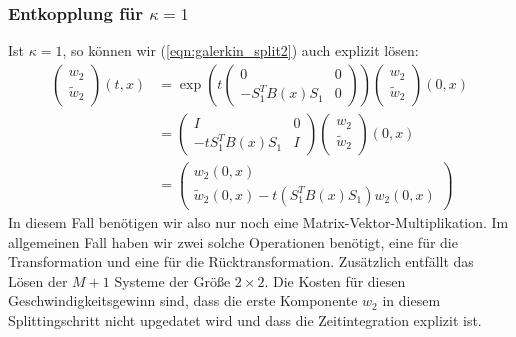 \subsubsection*{Entkopplung für $\kappa =1$}
Ist $\kappa=1$, so können wir (\ref{eqn:galerkin_split2}) auch explizit lösen:
\begin{align*}
\begin{pmatrix}w_2\\\tilde{w}_2\end{pmatrix}(t,x)&=\exp\left(t\begin{pmatrix}0 & 0\\ -S_1^TB(x)S_1 & 0\end{pmatrix}\right)\begin{pmatrix}w_2\\\tilde{w}_2\end{pmatrix}(0,x)\\
&=\begin{pmatrix}I & 0\\ -tS_1^TB(x)S_1 & I\end{pmatrix}\begin{pmatrix}w_2\\\tilde{w}_2\end{pmatrix}(0,x)\\
&=\begin{pmatrix}w_2(0,x)\\\tilde{w}_2(0,x)-t\left(S_1^TB(x)S_1\right)w_2(0,x)\end{pmatrix}
\end{align*}
In diesem Fall benötigen wir also nur noch eine Matrix-Vektor-Multiplikation. Im allgemeinen Fall haben wir zwei solche Operationen benötigt, eine für die Transformation und eine für die Rücktransformation. Zusätzlich entfällt das Lösen der $M+1$ Systeme der Größe $2\times 2$. Die Kosten für diesen Geschwindigkeitsgewinn sind, dass die erste Komponente $w_2$ in diesem Splittingschritt nicht upgedatet wird und dass die Zeitintegration explizit ist.
\newpage
